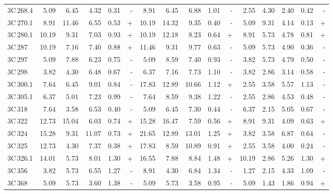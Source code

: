 \documentclass[mathleft,fleqn,%
]{an}
\begin{document}
\begin{table*}
\begin{tabular}{l|rrrrr|rrrrr|rrrrr}
   3C\,268.4 &   5.09 &   6.45 &   4.32 &   0.31 & -  &   8.91 &   6.45 &   6.88 &   1.01 & -  &   2.55 &   4.30 &   2.40 &   0.42 & -   \\
   3C\,270.1 &   8.91 &  11.46 &   6.55 &   0.53 & +  &  10.19 &  14.32 &   9.35 &   0.40 & -  &   5.09 &   9.31 &   4.14 &   0.13 & +   \\
   3C\,280.1 &  10.19 &   9.31 &   7.03 &   0.93 & +  &  10.19 &  12.18 &   8.23 &   0.64 & +  &   8.91 &   5.73 &   4.78 &   0.81 & +   \\
     3C\,287 &  10.19 &   7.16 &   7.40 &   0.88 & +  &  11.46 &   9.31 &   9.77 &   0.63 & -  &   5.09 &   5.73 &   4.90 &   0.36 & -   \\
     3C\,297 &   5.09 &   7.88 &   6.23 &   0.75 & -  &   5.09 &   8.59 &   7.40 &   0.93 & -  &   3.82 &   5.73 &   4.79 &   0.50 & -   \\
     3C\,298 &   3.82 &   4.30 &   6.48 &   0.67 & -  &   6.37 &   7.16 &   7.73 &   1.10 & -  &   3.82 &   2.86 &   3.14 &   0.58 & -   \\
   3C\,300.1 &   7.64 &   6.45 &   9.01 &   0.84 & -  &  17.83 &  12.89 &  10.66 &   1.12 & +  &   2.55 &   3.58 &   5.57 &   1.13 & -   \\
   3C\,305.1 &   6.37 &   5.01 &   7.23 &   0.99 & -  &   7.64 &   8.59 &   9.38 &   1.22 & -  &   2.55 &   2.86 &   4.53 &   0.48 & -   \\
     3C\,318 &   7.64 &   3.58 &   6.53 &   0.40 & -  &   5.09 &   6.45 &   7.30 &   0.44 & -  &   6.37 &   2.15 &   5.05 &   0.67 & -   \\
     3C\,322 &  12.73 &  15.04 &   6.03 &   0.74 & +  &  15.28 &  16.47 &   7.59 &   0.56 & +  &   8.91 &   9.31 &   4.09 &   0.63 & +   \\
     3C\,324 &  15.28 &   9.31 &  11.07 &   0.73 & +  &  21.65 &  12.89 &  13.01 &   1.25 & +  &   3.82 &   3.58 &   6.87 &   0.64 & -   \\
     3C\,325 &  12.73 &   4.30 &   7.37 &   0.38 & +  &  17.83 &   8.59 &  10.89 &   0.91 & +  &   2.55 &   3.58 &   4.00 &   0.24 & -   \\
   3C\,326.1 &  14.01 &   5.73 &   8.01 &   1.30 & +  &  16.55 &   7.88 &   8.84 &   1.48 & +  &  10.19 &   2.86 &   5.26 &   1.30 & +   \\
     3C\,356 &   3.82 &   5.73 &   6.55 &   1.27 & -  &   8.91 &   4.30 &   6.84 &   1.34 & -  &   1.27 &   2.15 &   4.33 &   1.09 & -   \\
     3C\,368 &   5.09 &   5.73 &   3.60 &   1.38 & -  &   5.09 &   5.73 &   3.58 &   0.95 & -  &   5.09 &   1.43 &   1.86 &   0.94 & +   \\

\end{tabular}
\end{table*}
\end{document}
